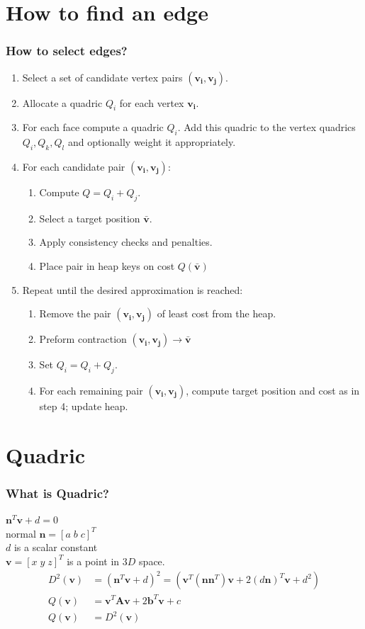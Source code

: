 \documentclass[
	10pt,
	t		%
]{beamer}
\begin{document}
\section{How to find an edge}
\begin{frame}
\frametitle{How to select edges?}
\centering
\begin{enumerate}
\item Select a set of candidate vertex pairs $(\mathbf{v_i}, \mathbf{v_j})$.
\item Allocate a quadric $Q_i$ for each vertex $\mathbf{v_i}$.
\item For each face compute a quadric $Q_i$. Add this quadric to the vertex quadrics $Q_i, Q_k, Q_l$ and optionally weight it appropriately.
\item For each candidate pair $(\mathbf{v_i}, \mathbf{v_j})$:
\begin{enumerate}
\item Compute $Q = Q_i + Q_j$.
\item Select a target position $\mathbf{\bar{v}}$.
\item Apply consistency checks and penalties.
\item Place pair in heap keys on cost $Q(\mathbf{\bar{v}})$
\end{enumerate}
\item Repeat until the desired approximation is reached:
\begin{enumerate}
\item Remove the pair $(\mathbf{v_i}, \mathbf{v_j})$ of least cost from the heap.
\item Preform contraction $(\mathbf{v_i}, \mathbf{v_j})\rightarrow\bar{\mathbf{v}}$
\item Set $Q_i = Q_i + Q_j$.
\item For each remaining pair $(\mathbf{v_i}, \mathbf{v_j})$, compute target position and cost as in step 4; update heap.
\end{enumerate}
\end{enumerate}
\end{frame}

\section{Quadric}
\begin{frame}
\frametitle{What is Quadric?}
\centering
$\mathbf{n}^T\mathbf{v}+d=0$\\ normal $\mathbf{n} = [a\;b\;c]^T$\\ $d$ is a scalar constant\\ $\mathbf{v} = [x\;y\;z]^T$ is a point in $3D$ space.
\\
\begin{align}
D^2(\mathbf{v}) &= (\mathbf{n}^T\mathbf{v}+d)^2 = (\mathbf{v}^T(\mathbf{n}\mathbf{n}^T)\mathbf{v}+2(d\mathbf{n})^T\mathbf{v}+d^2)\\
Q(\mathbf{v}) &= \mathbf{v}^T\mathbf{A}\mathbf{v} + 2\mathbf{b}^T\mathbf{v} + c\\
Q(\mathbf{v}) &= D^2(\mathbf{v})
\end{align}
\end{frame}
\end{document}
